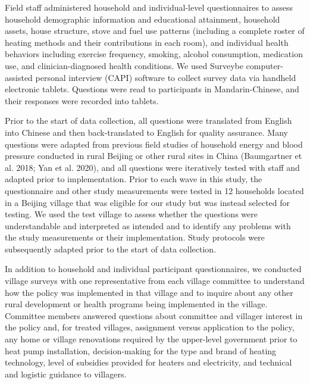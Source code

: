 \documentclass[
  letterpaper,
  DIV=11,
  numbers=noendperiod]{scrartcl}
\providecommand{\DIFaddtex}[1]{{\protect\color{blue}\uwave{#1}}} %
\providecommand{\DIFaddbegin}{} %
\providecommand{\DIFaddend}{} %
\providecommand{\DIFdelbegin}{} %
\providecommand{\DIFdelend}{} %
\providecommand{\DIFadd}[1]{\texorpdfstring{\DIFaddtex{#1}}{#1}} %
\newcommand{\DIFscaledelfig}{0.5}
\newlength{\DIFdelgraphicswidth} %
\newlength{\DIFdelgraphicsheight} %
\newcommand{\DIFaddincludegraphics}[2][]{{\color{blue}\fbox{\DIFOincludegraphics[#1]{#2}}}} %
\newcommand{\DIFdelincludegraphics}[2][]{%
\sbox{\DIFdelgraphicsbox}{\DIFOincludegraphics[#1]{#2}}%
\settoboxwidth{\DIFdelgraphicswidth}{\DIFdelgraphicsbox} %
\settoboxtotalheight{\DIFdelgraphicsheight}{\DIFdelgraphicsbox} %
\scalebox{\DIFscaledelfig}{%
\parbox[b]{\DIFdelgraphicswidth}{\usebox{\DIFdelgraphicsbox}\\[-\baselineskip] \rule{\DIFdelgraphicswidth}{0em}}\llap{\resizebox{\DIFdelgraphicswidth}{\DIFdelgraphicsheight}{%
\setlength{\unitlength}{\DIFdelgraphicswidth}%
\begin{picture}(1,1)%
\thicklines\linethickness{2pt} %
{\color[rgb]{1,0,0}\put(0,0){\framebox(1,1){}}}%
{\color[rgb]{1,0,0}\put(0,0){\line( 1,1){1}}}%
{\color[rgb]{1,0,0}\put(0,1){\line(1,-1){1}}}%
\end{picture}%
}\hspace*{3pt}}} %
} %
\DeclareRobustCommand{\DIFaddbegin}{\DIFOaddbegin \let\includegraphics\DIFaddincludegraphics} %
\DeclareRobustCommand{\DIFaddend}{\DIFOaddend \let\includegraphics\DIFOincludegraphics} %
\DeclareRobustCommand{\DIFdelbegin}{\DIFOdelbegin \let\includegraphics\DIFdelincludegraphics} %
\DeclareRobustCommand{\DIFdelend}{\DIFOaddend \let\includegraphics\DIFOincludegraphics} %
\begin{document}
Field staff administered household and individual-level questionnaires
to assess household demographic information and educational attainment,
household assets, house structure, stove and fuel use patterns
(including a complete roster of heating methods and their contributions
in each room), and individual health behaviors including exercise
frequency, smoking, alcohol consumption, medication use, and
clinician-diagnosed health conditions. We used Surveybe
computer-assisted personal interview (CAPI) software to collect survey
data via handheld electronic tablets. Questions were read to
participants in Mandarin-Chinese, and their responses were recorded into
tablets.

Prior to the start of data collection, all questions were translated
from English into Chinese and then back-translated to English for
quality assurance. Many questions were adapted from previous field
studies of household energy and blood pressure conducted in rural
Beijing or other rural sites in China (Baumgartner et al. 2018; Yan et
al. 2020), and all questions were iteratively tested with staff and
adapted prior to implementation. Prior to each wave in this study, the
questionnaire and other study measurements were tested in 12 households
located in a Beijing village that was eligible for our study but was
instead selected for testing. We used the test village to assess whether
the questions were understandable and interpreted as intended and to
identify any problems with the study measurements or their
implementation. Study protocols were subsequently adapted prior to the
start of data collection.

In addition to household and individual participant questionnaires, we
conducted village surveys with one representative from each village
committee to understand how the policy was implemented in that village
and to inquire about any other rural development or health programs
being implemented in the village. Committee members answered questions
about committee and villager interest in the policy and, for treated
villages, assignment versus application to the policy, any home or
village renovations required by the upper-level government prior to heat
pump installation, decision-making for the type and brand of heating
technology, level of subsidies provided for heaters and electricity, and
technical and logistic guidance to villagers.

\DIFdelbegin %
\DIFdelend \DIFaddbegin \subsubsection{\DIFadd{Blood pressure}}\label{blood-pressure}
\DIFaddend 
\end{document}

